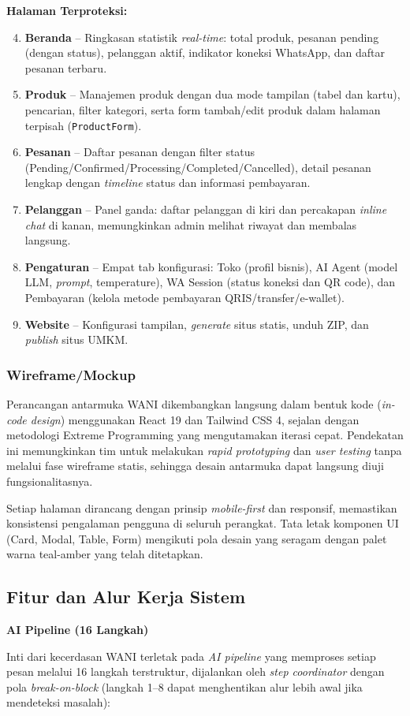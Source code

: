\documentclass[12pt,a4paper,oneside]{article}
\newcommand{\sub}[1]{%
    \subsection{#1}%
}
\newcommand{\subsub}[1]{%
    \subsubsection{#1}%
}
\begin{document}
\textbf{Halaman Terproteksi:}
\begin{enumerate}
	\setcounter{enumi}{3}
	\item \textbf{Beranda} -- Ringkasan statistik \textit{real-time}: total produk, pesanan pending (dengan status), pelanggan aktif, indikator koneksi WhatsApp, dan daftar pesanan terbaru.
	\item \textbf{Produk} -- Manajemen produk dengan dua mode tampilan (tabel dan kartu), pencarian, filter kategori, serta form tambah/edit produk dalam halaman terpisah (\texttt{ProductForm}).
	\item \textbf{Pesanan} -- Daftar pesanan dengan filter status (Pending/Confirmed/Processing/Completed/Cancelled), detail pesanan lengkap dengan \textit{timeline} status dan informasi pembayaran.
	\item \textbf{Pelanggan} -- Panel ganda: daftar pelanggan di kiri dan percakapan \textit{inline chat} di kanan, memungkinkan admin melihat riwayat dan membalas langsung.
	\item \textbf{Pengaturan} -- Empat tab konfigurasi: Toko (profil bisnis), AI Agent (model LLM, \textit{prompt}, temperature), WA Session (status koneksi dan QR code), dan Pembayaran (kelola metode pembayaran QRIS/transfer/e-wallet).
	\item \textbf{Website} -- Konfigurasi tampilan, \textit{generate} situs statis, unduh ZIP, dan \textit{publish} situs UMKM.
\end{enumerate}

\subsub{Wireframe/Mockup}

Perancangan antarmuka WANI dikembangkan langsung dalam bentuk kode (\textit{in-code design}) menggunakan React 19 dan Tailwind CSS 4, sejalan dengan metodologi Extreme Programming yang mengutamakan iterasi cepat. Pendekatan ini memungkinkan tim untuk melakukan \textit{rapid prototyping} dan \textit{user testing} tanpa melalui fase wireframe statis, sehingga desain antarmuka dapat langsung diuji fungsionalitasnya.

Setiap halaman dirancang dengan prinsip \textit{mobile-first} dan responsif, memastikan konsistensi pengalaman pengguna di seluruh perangkat. Tata letak komponen UI (Card, Modal, Table, Form) mengikuti pola desain yang seragam dengan palet warna teal-amber yang telah ditetapkan.

\sub{Fitur dan Alur Kerja Sistem}

\textbf{AI Pipeline (16 Langkah)}

Inti dari kecerdasan WANI terletak pada \textit{AI pipeline} yang memproses setiap pesan melalui 16 langkah terstruktur, dijalankan oleh \textit{step coordinator} dengan pola \textit{break-on-block} (langkah 1--8 dapat menghentikan alur lebih awal jika mendeteksi masalah):
\end{document}
